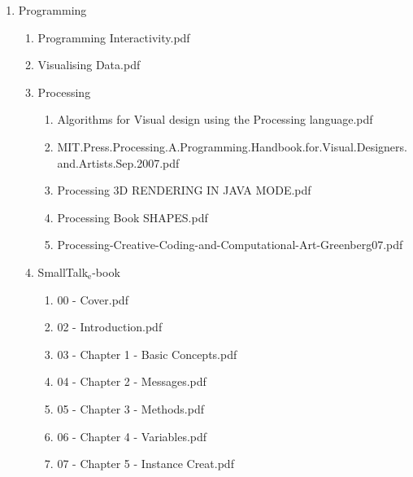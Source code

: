 \documentclass[11pt]{article}
\begin{document}
\begin{enumerate}
\item Programming
\label{sec-1-1-1-1-49-1-5-23}
\begin{enumerate}
\item Programming Interactivity.pdf
\label{sec-1-1-1-1-49-1-5-23-1}

\item Visualising Data.pdf
\label{sec-1-1-1-1-49-1-5-23-2}

\item Processing
\label{sec-1-1-1-1-49-1-5-23-3}
\begin{enumerate}
\item Algorithms for Visual design using the Processing language.pdf
\label{sec-1-1-1-1-49-1-5-23-3-1}

\item MIT.Press.Processing.A.Programming.Handbook.for.Visual.Designers.and.Artists.Sep.2007.pdf
\label{sec-1-1-1-1-49-1-5-23-3-2}

\item Processing 3D RENDERING IN JAVA MODE.pdf
\label{sec-1-1-1-1-49-1-5-23-3-3}

\item Processing Book SHAPES.pdf
\label{sec-1-1-1-1-49-1-5-23-3-4}

\item Processing-Creative-Coding-and-Computational-Art-Greenberg07.pdf
\label{sec-1-1-1-1-49-1-5-23-3-5}
\end{enumerate}

\item SmallTalk$_{\text{e}}$-book
\label{sec-1-1-1-1-49-1-5-23-4}
\begin{enumerate}
\item 00 - Cover.pdf
\label{sec-1-1-1-1-49-1-5-23-4-1}

\item 02 - Introduction.pdf
\label{sec-1-1-1-1-49-1-5-23-4-2}

\item 03 - Chapter 1 - Basic Concepts.pdf
\label{sec-1-1-1-1-49-1-5-23-4-3}

\item 04 - Chapter 2 - Messages.pdf
\label{sec-1-1-1-1-49-1-5-23-4-4}

\item 05 - Chapter 3 - Methods.pdf
\label{sec-1-1-1-1-49-1-5-23-4-5}

\item 06 - Chapter 4 - Variables.pdf
\label{sec-1-1-1-1-49-1-5-23-4-6}

\item 07 - Chapter 5 - Instance Creat.pdf
\label{sec-1-1-1-1-49-1-5-23-4-7}


\end{enumerate}
\end{enumerate}
\end{enumerate}
\end{document}
